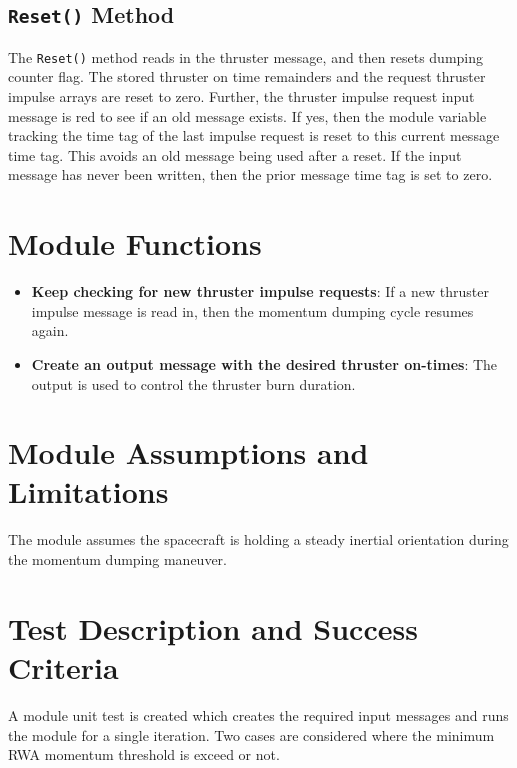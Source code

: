 \documentclass[]{BasiliskReportMemo}
\begin{document}
\subsection{{\tt Reset()} Method}
The {\tt Reset()} method reads in the thruster message, and then resets dumping counter flag.  The stored thruster on time remainders and the request thruster impulse arrays are reset to zero.  Further, the thruster impulse request input message is red to see if an old message exists.  If yes, then the module variable tracking the time tag of the last impulse request is reset to this current message time tag. This avoids an old message being used after a reset.  If the input message has never been written, then the prior message time tag is set to zero.









\section{Module Functions}
\begin{itemize}
	\item \textbf{Keep checking for new thruster impulse requests}: If a new thruster impulse message is read in, then the momentum dumping cycle resumes again.
	\item \textbf{Create an output message with the desired thruster on-times}: The output is used to control the thruster burn duration.
\end{itemize}

\section{Module Assumptions and Limitations}
The module assumes the spacecraft is holding a steady inertial orientation during the momentum dumping maneuver.  










\section{Test Description and Success Criteria}
A module unit test is created which creates the required input messages and runs the module for a single iteration.  Two cases are considered where the minimum RWA momentum threshold is exceed or not.
\end{document}
